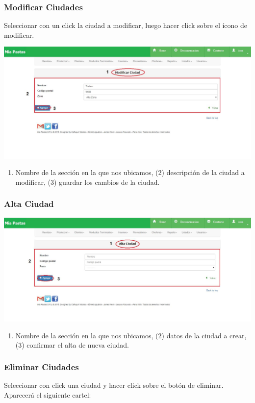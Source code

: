 \documentclass[letterpaper,10pt,english]{sphinxmanual}
\begin{document}
\subsubsection{Modificar Ciudades}
\label{ciudades:modificar-ciudades}
Seleccionar con un click la ciudad a modificar, luego hacer click sobre el ícono de modificar.

\includegraphics{ciudades_modificar.jpg}
\begin{enumerate}
\item {} 
Nombre de la sección en la que nos ubicamos, (2) descripción de la ciudad a modificar, (3)  guardar los cambios de la ciudad.

\end{enumerate}


\subsubsection{Alta Ciudad}
\label{ciudades:alta-ciudad}
\includegraphics{ciudades_alta.jpg}
\begin{enumerate}
\item {} 
Nombre de la sección en la que nos ubicamos, (2) datos de la ciudad a crear, (3) confirmar el alta de nueva ciudad.

\end{enumerate}


\subsubsection{Eliminar Ciudades}
\label{ciudades:eliminar-ciudades}
Seleccionar con click una ciudad y hacer click sobre el botón de eliminar. Aparecerá el siguiente cartel:
\end{document}

